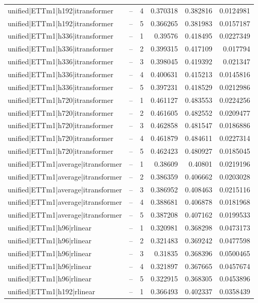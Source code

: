 \begin{longtable}{llrrrr}
unified|ETTm1|h192|itransformer & -- & 4 & 0.370318 & 0.382816 & 0.0124981 \\
unified|ETTm1|h192|itransformer & -- & 5 & 0.366265 & 0.381983 & 0.0157187 \\
unified|ETTm1|h336|itransformer & -- & 1 & 0.39576 & 0.418495 & 0.0227349 \\
unified|ETTm1|h336|itransformer & -- & 2 & 0.399315 & 0.417109 & 0.017794 \\
unified|ETTm1|h336|itransformer & -- & 3 & 0.398045 & 0.419392 & 0.021347 \\
unified|ETTm1|h336|itransformer & -- & 4 & 0.400631 & 0.415213 & 0.0145816 \\
unified|ETTm1|h336|itransformer & -- & 5 & 0.397231 & 0.418529 & 0.0212986 \\
unified|ETTm1|h720|itransformer & -- & 1 & 0.461127 & 0.483553 & 0.0224256 \\
unified|ETTm1|h720|itransformer & -- & 2 & 0.461605 & 0.482552 & 0.0209477 \\
unified|ETTm1|h720|itransformer & -- & 3 & 0.462858 & 0.481547 & 0.0186886 \\
unified|ETTm1|h720|itransformer & -- & 4 & 0.461879 & 0.484611 & 0.0227314 \\
unified|ETTm1|h720|itransformer & -- & 5 & 0.462423 & 0.480927 & 0.0185045 \\
unified|ETTm1|average|itransformer & -- & 1 & 0.38609 & 0.40801 & 0.0219196 \\
unified|ETTm1|average|itransformer & -- & 2 & 0.386359 & 0.406662 & 0.0203028 \\
unified|ETTm1|average|itransformer & -- & 3 & 0.386952 & 0.408463 & 0.0215116 \\
unified|ETTm1|average|itransformer & -- & 4 & 0.388681 & 0.406878 & 0.0181968 \\
unified|ETTm1|average|itransformer & -- & 5 & 0.387208 & 0.407162 & 0.0199533 \\
unified|ETTm1|h96|rlinear & -- & 1 & 0.320981 & 0.368298 & 0.0473173 \\
unified|ETTm1|h96|rlinear & -- & 2 & 0.321483 & 0.369242 & 0.0477598 \\
unified|ETTm1|h96|rlinear & -- & 3 & 0.31835 & 0.368396 & 0.0500465 \\
unified|ETTm1|h96|rlinear & -- & 4 & 0.321897 & 0.367665 & 0.0457674 \\
unified|ETTm1|h96|rlinear & -- & 5 & 0.322915 & 0.368305 & 0.0453896 \\
unified|ETTm1|h192|rlinear & -- & 1 & 0.366493 & 0.402337 & 0.0358439 \\

\end{longtable}
